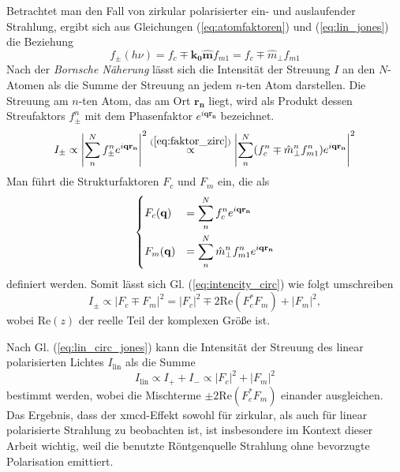 \noindent
Betrachtet man den Fall von zirkular polarisierter ein- und auslaufender Strahlung, ergibt sich aus Gleichungen (\ref{eq:atomfaktoren}) und (\ref{eq:lin_jones}) die Beziehung
\begin{equation}
    f_{\pm}(h\nu)=f_{c}\mp \mathbf{k_0}\mathbf{\hat{m}} f_{m1} = f_{c}\mp \hat{m}_\perp f_{m1}
    \label{eq:faktor_zirc}
\end{equation}
Nach der \emph{Bornsche Näherung} lässt sich die Intensität der Streuung $I$ an den $N$-Atomen als die Summe der Streuung an jedem $n$-ten Atom darstellen. Die Streuung am $n$-ten Atom, das am Ort $\mathbf{r_n}$ liegt, wird als Produkt dessen Streufaktors $f_{\pm}^n$ mit dem Phasenfaktor $e^{i\mathbf{qr_n}}$ bezeichnet.
\begin{equation}
    I_{\pm} \propto \left| \sum_{n}^N f_{\pm}^n e^{i\mathbf{qr_n}} \right|^2 \stackrel{{(\ref{eq:faktor_zirc})}}{\propto} \left| \sum_{n}^N (f_{c}^n\mp {\hat{m}_\perp}^n f_{m1}^n) e^{i\mathbf{qr_n}} \right|^2
    \label{eq:intencity_circ}
\end{equation}
Man führt die Strukturfaktoren $F_c$ und $F_m$ ein, die als
\begin{equation}
    \begin{dcases}
     F_c(\mathbf{q}) &= \sum^N_n f_c^n e^{i\mathbf{qr_n}}\\
     F_m(\mathbf{q}) &= \sum^N_n {\hat{m}_\perp}^n f_{m1}^n e^{i\mathbf{qr_n}}
    \end{dcases}
    \label{eq:fc_fm_substitution}
\end{equation}
definiert werden. Somit lässt sich Gl. (\ref{eq:intencity_circ}) wie folgt umschreiben
\begin{equation}
     I_{\pm} \propto \left| F_c \mp F_m \right|^2 = \left| F_c \right|^2 \mp 2\text{Re}(F_c^*F_m) + \left| F_m \right|^2,
\end{equation}
wobei $\text{Re}(z)$ der reelle Teil der komplexen Größe ist.

\noindent
Nach Gl. (\ref{eq:lin_circ_jones}) kann die Intensität der Streuung des linear polarisierten Lichtes $I_{\text{lin}}$ als die Summe
\begin{equation}
    I_{\text{lin}} \propto I_+ + I_- \propto  \left| F_c \right|^2 + \left| F_m \right|^2
\end{equation}
bestimmt werden, wobei die Mischterme $\pm2\text{Re}(F_c^*F_m)$ einander ausgleichen. Das Ergebnis, dass der \gls{xmcd}-Effekt sowohl für zirkular, als auch für linear polarisierte Strahlung zu beobachten ist, ist insbesondere im Kontext dieser Arbeit wichtig, weil die benutzte Röntgenquelle Strahlung ohne bevorzugte Polarisation emittiert.

